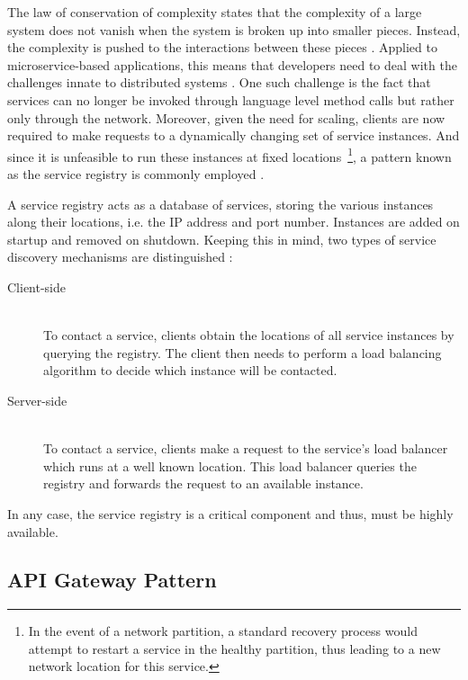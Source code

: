 The law of conservation of complexity states that the complexity of a large system does not vanish when the system is broken up into smaller pieces. Instead, the complexity is pushed to the interactions between these pieces \cite[p.~38]{messina2016simplified} \cite[p.~114]{thones2015microservices}. Applied to microservice-based applications, this means that developers need to deal with the challenges innate to distributed systems \cite[p.~24]{dmitry2014micro} \cite[p.~589]{villamizar2015evaluating}. One such challenge is the fact that services can no longer be invoked through language level method calls but rather only through the network. Moreover, given the need for scaling, clients are now required to make requests to a dynamically changing set of service instances. And since it is unfeasible to run these instances at fixed locations~\footnote{In the event of a network partition, a standard recovery process would attempt to restart a service in the healthy partition, thus leading to a new network location for this service.}, a pattern known as the service registry is commonly employed \cite[p.~37]{messina2016simplified}.

A service registry acts as a database of services, storing the various instances along their locations, i.e. the \acs{IP} address and port number. Instances are added on startup and removed on shutdown. Keeping this in mind, two types of service discovery mechanisms are distinguished \cite[p.~46]{khan2017key}:

\begin{description}
  \item[Client-side]
  \hfill \\
  To contact a service, clients obtain the locations of all service instances by querying the registry. The client then needs to perform a load balancing algorithm to decide which instance will be contacted.

  \item[Server-side]
  \hfill \\
  To contact a service, clients make a request to the service's load balancer which runs at a well known location. This load balancer queries the registry and forwards the request to an available instance.
\end{description}

In any case, the service registry is a critical component and thus, must be highly available.


\subsection{\acs{API} Gateway Pattern}
\label{sec:api-gateway-pattern}

